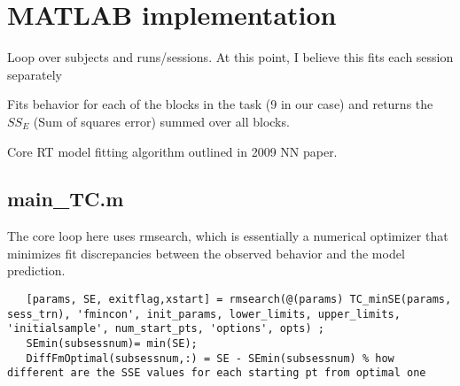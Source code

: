 \documentclass[12pt]{article}
\renewenvironment{description}[1][0pt]
  {\list{}{\labelwidth=0pt \leftmargin=#1
   \let\makelabel\descriptionlabel}}
  {\endlist}
\begin{document}
\section{MATLAB implementation}

\begin{description}[1cm]
	\item[main\_TC.m] Loop over subjects and runs/sessions. At this point, I believe this fits each session separately
	\item[TC\_minSE.m] Fits behavior for each of the blocks in the task (9 in our case) and returns the $SS_E$ (Sum of squares error) summed over all blocks.
	\item[TC\_Alg.m] Core RT model fitting algorithm outlined in 2009 NN paper.
	
\end{description}

\subsection{main\_TC.m}
	
The core loop here uses rmsearch, which is essentially a numerical optimizer that minimizes fit discrepancies between the observed behavior and the model prediction.

\begin{lstlisting}
   [params, SE, exitflag,xstart] = rmsearch(@(params) TC_minSE(params, sess_trn), 'fmincon', init_params, lower_limits, upper_limits, 'initialsample', num_start_pts, 'options', opts) ;
   SEmin(subsessnum)= min(SE);
   DiffFmOptimal(subsessnum,:) = SE - SEmin(subsessnum) % how different are the SSE values for each starting pt from optimal one
\end{lstlisting}
\end{document}
